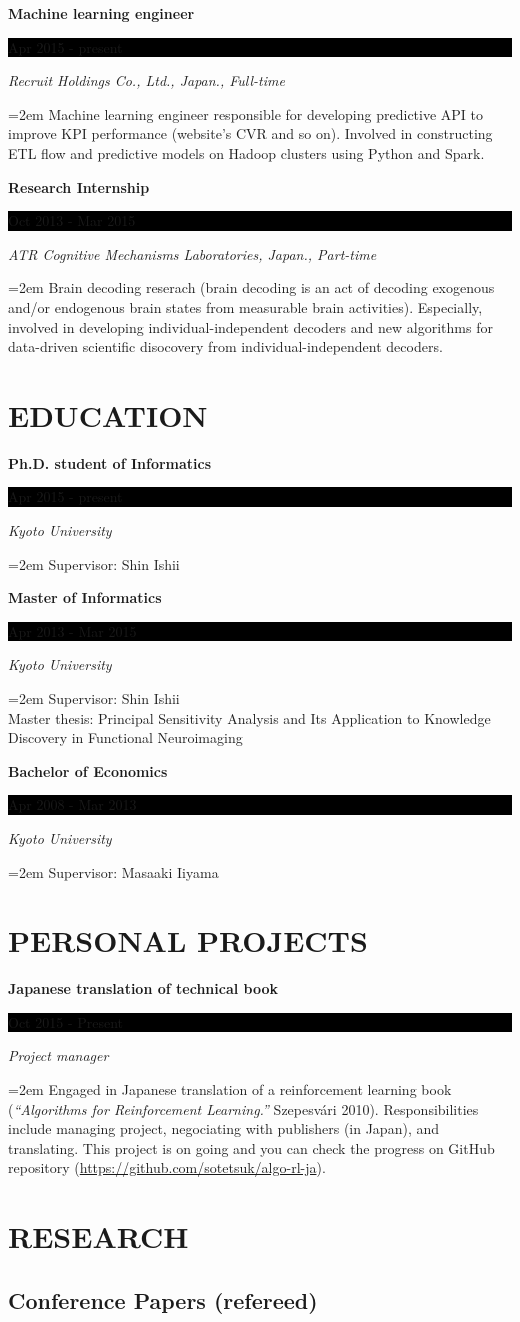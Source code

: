 \documentclass[paper=a4,fontsize=11pt]{scrartcl} %
\newcommand{\sepspace}{\vspace*{1em}}		%
\newcommand{\NewPart}[1]{\section*{\uppercase{#1}}}
\newcommand{\EducationEntry}[4]{
		\noindent \textbf{#1} \hfill      %
		\colorbox{Black}{%
			\parbox{10em}{%
			\hfill\color{White}#2}} \par  %
		\noindent \textit{#3} \par        %
		\noindent\hangindent=2em\hangafter=0 \small #4 %
		\normalsize \par}
\begin{document}
\EducationEntry{Machine learning engineer}{Apr 2015 - present}{Recruit Holdings Co., Ltd., Japan., Full-time}{
Machine learning engineer responsible for developing predictive API to improve KPI performance (website's CVR and so on).
Involved in constructing ETL flow and predictive models on Hadoop clusters using Python and Spark.
}
\sepspace

\EducationEntry{Research Internship}{Oct 2013 - Mar 2015}{ATR Cognitive Mechanisms Laboratories, Japan., Part-time}{
Brain decoding reserach (brain decoding is an act of decoding exogenous and/or endogenous brain
states from measurable brain activities). Especially, involved in developing individual-independent decoders and
new algorithms for data-driven scientific disocovery from individual-independent decoders.
}

\NewPart{Education}{}

\EducationEntry{Ph.D. student of Informatics}{Apr 2015 - present}{Kyoto University}{Supervisor: Shin Ishii}
\sepspace

\EducationEntry{Master of Informatics}{Apr 2013 - Mar 2015}{Kyoto University}{Supervisor: Shin Ishii\\
Master thesis: Principal Sensitivity Analysis and Its Application to Knowledge Discovery in Functional Neuroimaging
}
\sepspace

\EducationEntry{Bachelor of Economics}{Apr 2008 - Mar 2013}{Kyoto University}{Supervisor: Masaaki Iiyama}

\NewPart{Personal projects}{}

\EducationEntry{Japanese translation of technical book}{Oct 2015 - Present}{Project manager}{
Engaged in Japanese translation of a reinforcement learning book ({\em ``Algorithms for Reinforcement Learning.''} Szepesv\'ari 2010).
Responsibilities include managing project, negociating with publishers (in Japan), and translating.
This project is on going and you can check the progress on GitHub repository (\url{https://github.com/sotetsuk/algo-rl-ja}).
}


\NewPart{Research}{}

\subsection*{Conference Papers (refereed)}
\end{document}
